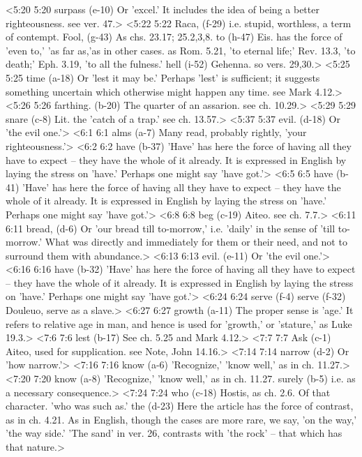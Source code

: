 <5:20 5:20  surpass (e-10)  Or 'excel.' It includes the idea of being a better  righteousness. see ver. 47.>
<5:22 5:22  Raca, (f-29)  i.e. stupid, worthless, a term of contempt.
  Fool, (g-43)  As chs. 23.17; 25.2,3,8.
  to (h-47)  Eis. has the force of 'even to,' 'as far as,'as in other  cases. as Rom. 5.21, 'to eternal life;' Rev. 13.3, 'to death;'  Eph. 3.19, 'to all the fulness.'
  hell (i-52)  Gehenna. so vers. 29,30.>
<5:25 5:25  time (a-18)  Or 'lest it may be.' Perhaps 'lest' is sufficient; it  suggests something uncertain which otherwise might happen any  time. see Mark 4.12.>
<5:26 5:26  farthing. (b-20)  The quarter of an assarion. see ch. 10.29.>
<5:29 5:29  snare (c-8)  Lit. the 'catch of a trap.' see ch. 13.57.>
<5:37 5:37  evil. (d-18)  Or 'the evil one.'>
<6:1 6:1  alms (a-7)  Many read, probably rightly, 'your righteousness.'>
<6:2 6:2  have (b-37) 'Have' has here the force of having all they have to expect -- they have the whole of it already. It is expressed in English by laying the stress on 'have.' Perhaps one might say 'have got.'>
<6:5 6:5  have (b-41) 'Have' has here the force of having all they have to expect -- they have the whole of it already. It is expressed in English by laying the stress on 'have.' Perhaps one might say 'have got.'>
<6:8 6:8  beg (c-19)  Aiteo. see ch. 7.7.>
<6:11 6:11  bread, (d-6)  Or 'our bread till to-morrow,' i.e. 'daily' in the sense of  'till to-morrow.' What was directly and immediately for them or  their need, and not to surround them with abundance.>
<6:13 6:13  evil. (e-11)  Or 'the evil one.'>
<6:16 6:16  have (b-32)  'Have' has here the force of having all they have to expect  -- they have the whole of it already. It is expressed in  English by laying the stress on 'have.' Perhaps one might say  'have got.'>
<6:24 6:24  serve (f-4)  serve (f-32)
  Douleuo, serve as a slave.>
<6:27 6:27  growth (a-11)  The proper sense is 'age.' It refers to relative age in man,  and hence is used for 'growth,' or 'stature,' as Luke 19.3.>
<7:6 7:6  lest (b-17)  See ch. 5.25 and Mark 4.12.>
<7:7 7:7  Ask (c-1)  Aiteo, used for supplication. see Note, John 14.16.>
<7:14 7:14  narrow (d-2)  Or 'how narrow.'>
<7:16 7:16  know (a-6) 'Recognize,' 'know well,' as in ch. 11.27.>
<7:20 7:20  know (a-8)  'Recognize,' 'know well,' as in ch. 11.27.
  surely (b-5)  i.e. as a necessary consequence.>
<7:24 7:24  who (c-18)  Hostis, as ch. 2.6. Of that character. 'who was such as.'
  the (d-23)  Here the article has the force of contrast, as in ch. 4.21.  As in English, though the cases are more rare, we say, 'on the  way,' 'the way side.' 'The sand' in ver. 26, contrasts with  'the rock' -- that which has that nature.>
